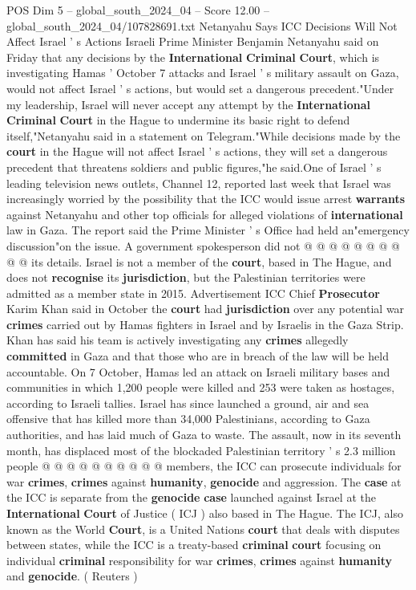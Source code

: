\begin{textsample}{POS Dim 5 – global\_south\_2024\_04 – Score 12.00 – global\_south\_2024\_04/107828691.txt}  \label{ex:f5_pos_332}
Netanyahu Says ICC Decisions Will Not Affect Israel ' s Actions Israeli Prime Minister Benjamin Netanyahu said on Friday that any decisions by the \textbf{International} \textbf{Criminal} \textbf{Court}, which is investigating Hamas ' October 7 attacks and Israel ' s military assault on Gaza, would not affect Israel ' s actions, but would set a dangerous precedent."Under my leadership, Israel will never accept any attempt by the \textbf{International} \textbf{Criminal} \textbf{Court} in the Hague to undermine its basic right to defend itself,"Netanyahu said in a statement on Telegram."While decisions made by the \textbf{court} in the Hague will not affect Israel ' s actions, they will set a dangerous precedent that threatens soldiers and public figures,"he said.One of Israel ' s leading television news outlets, Channel 12, reported last week that Israel was increasingly worried by the possibility that the ICC would issue arrest \textbf{warrants} against Netanyahu and other top officials for alleged violations of \textbf{international} law in Gaza.
The report said the Prime Minister ' s Office had held an"emergency discussion"on the issue.
A government spokesperson did not @ @ @ @ @ @ @ @ @ @ its details.
Israel is not a member of the \textbf{court}, based in The Hague, and does not \textbf{recognise} its \textbf{jurisdiction}, but the Palestinian territories were admitted as a member state in 2015.
Advertisement ICC Chief \textbf{Prosecutor} Karim Khan said in October the \textbf{court} had \textbf{jurisdiction} over any potential war \textbf{crimes} carried out by Hamas fighters in Israel and by Israelis in the Gaza Strip.
Khan has said his team is actively investigating any \textbf{crimes} allegedly \textbf{committed} in Gaza and that those who are in breach of the law will be held accountable.
On 7 October, Hamas led an attack on Israeli military bases and communities in which 1,200 people were killed and 253 were taken as hostages, according to Israeli tallies.
Israel has since launched a ground, air and sea offensive that has killed more than 34,000 Palestinians, according to Gaza authorities, and has laid much of Gaza to waste.
The assault, now in its seventh month, has displaced most of the blockaded Palestinian territory ' s 2.3 million people @ @ @ @ @ @ @ @ @ @ members, the ICC can prosecute individuals for war \textbf{crimes}, \textbf{crimes} against \textbf{humanity}, \textbf{genocide} and aggression.
The \textbf{case} at the ICC is separate from the \textbf{genocide} \textbf{case} launched against Israel at the \textbf{International} \textbf{Court} of Justice ( ICJ ) also based in The Hague.
The ICJ, also known as the World \textbf{Court}, is a United Nations \textbf{court} that deals with disputes between states, while the ICC is a treaty-based \textbf{criminal} \textbf{court} focusing on individual \textbf{criminal} responsibility for war \textbf{crimes}, \textbf{crimes} against \textbf{humanity} and \textbf{genocide}. ( Reuters )

\end{textsample}
